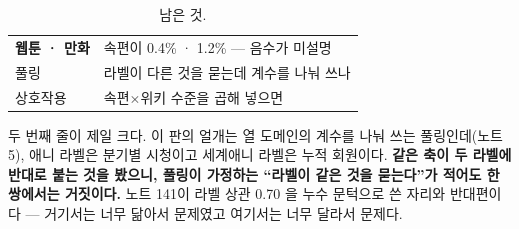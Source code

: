 \documentclass[10pt]{article}
\begin{document}
\begin{table}[t]
\centering\tsize
\caption{남은 것.}
\begin{tabular}{ll}
\toprule
\textbf{웹툰 · 만화} & 속편이 0.4\% · 1.2\% --- 음수가 미설명 \\
풀링 & 라벨이 다른 것을 묻는데 계수를 나눠 쓰나 \\
상호작용 & 속편$\times$위키 수준을 곱해 넣으면 \\
\bottomrule
\end{tabular}
\end{table}

두 번째 줄이 제일 크다. 이 판의 얼개는 열 도메인의 계수를 나눠 쓰는
풀링인데(노트 5), 애니 라벨은 분기별 시청이고 세계애니 라벨은 누적
회원이다. \textbf{같은 축이 두 라벨에 반대로 붙는 것을 봤으니, 풀링이
가정하는 ``라벨이 같은 것을 묻는다''가 적어도 한 쌍에서는 거짓이다.}
노트 141이 라벨 상관 0.70 을 누수 문턱으로 쓴 자리와 반대편이다 --- 거기서는
너무 닮아서 문제였고 여기서는 너무 달라서 문제다.
\end{document}
